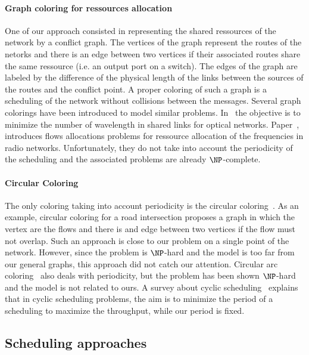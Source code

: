 \paragraph{Graph coloring for ressources allocation}
One of our approach consisted in representing the shared ressources of the network by a conflict graph. The vertices of the graph represent the routes of the netorks and there is an edge between two vertices if their associated routes share the same ressource (i.e. an output port on a switch). The edges of the graph are labeled by the difference of the physical length of the links between the sources of the routes and the conflict point. A proper coloring of such a graph is a scheduling of the network without collisions between the messages. Several graph colorings have been introduced to model similar problems. In~\cite{erlebach2001complexity} the objective is to minimize the number of wavelength in shared links for optical networks. Paper~\cite{borndorfer1998frequency}, introduces flows allocations problems for ressource allocation of the frequencies in radio networks. Unfortunately, they do not take into account the periodicity of the scheduling and the associated problems are already $\NP$-complete. 

\paragraph{Circular Coloring}
The only coloring taking into account periodicity is the circular coloring~\cite{ZHU2001371,zhou2013multiple}. As an example, circular coloring for a road intersection proposes a graph in which the vertex are the flows and there is and edge between two vertices if the flow must not overlap. Such an approach is close to our problem on a single point of the network. However, since the problem is $\NP$-hard and the model is too far from our general graphs, this approach did not catch our attention.
Circular arc coloring~\cite{10.2307/2100446} also deals with periodicity, but the problem has been shown $\NP$-hard~\cite{10.1007/BFb0053971} and the model is not related to ours. A survey about cyclic scheduling~\cite{levner2010complexity} explains that in cyclic scheduling problems, the aim is to minimize the period of a scheduling to maximize the throughput, while our period is fixed. 

\subsection{Scheduling approaches}


